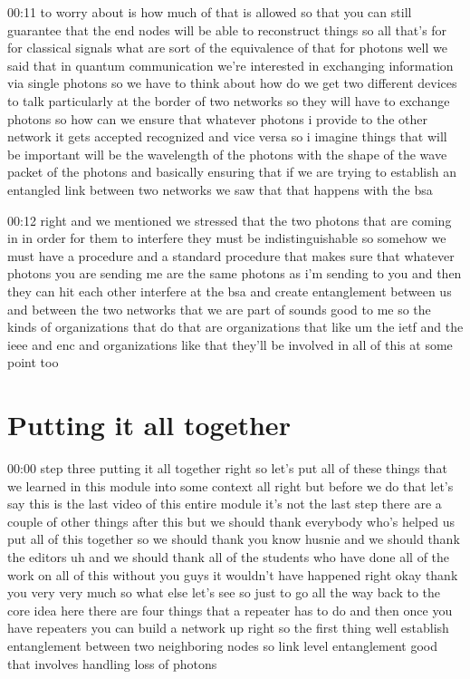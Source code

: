 00:11
to worry about is how much of that is allowed so that you
can still guarantee that the end nodes will be able to reconstruct things
so all that's for for classical signals what are sort of the equivalence of that
for photons well we said that in quantum communication we're
interested in exchanging information via single photons so we have to think
about how do we get two different devices to talk
particularly at the border of two networks so they will have to exchange
photons so how can we ensure that whatever photons i provide
to the other network it gets accepted recognized and vice versa
so i imagine things that will be important will be the wavelength
of the photons with the shape of the wave packet of the photons
and basically ensuring that if we are trying to establish an entangled
link between two networks we saw that that happens with the bsa

00:12
right and we mentioned we stressed that the two photons that are coming in
in order for them to interfere they must be indistinguishable
so somehow we must have a procedure and a standard procedure that makes sure
that whatever photons you are sending me are the same photons as i'm sending to
you and then they can hit each other interfere at the bsa and create
entanglement between us and between the two networks that we are part of
sounds good to me so the kinds of organizations that do that
are organizations that like um the ietf and the ieee and enc
and organizations like that they'll be involved in all of this at some point too

\section{Putting it all together}

00:00
step three putting it all together right so let's put all of these things
that we learned in this module into some context
all right but before we do that let's say this is the last video of this entire
module it's not the last step there are a couple of other things after this but
we should thank everybody who's helped us put all of this together so we should
thank you know husnie and we should thank the editors uh
and we should thank all of the students who have done all of the work on all of
this without you guys it wouldn't have happened right okay thank you very
very much so what else let's see so just to go all the way back to the
core idea here there are four things that a repeater
has to do and then once you have repeaters
you can build a network up right so the first thing
well establish entanglement between two neighboring nodes so
link level entanglement good that involves handling loss of photons

